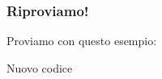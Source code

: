 \begin{frame}[fragile]
 \frametitle{Riproviamo!}
 
 Proviamo con questo esempio:
\begin{esempio}{Nuovo codice}
\end{esempio}
\end{frame}
